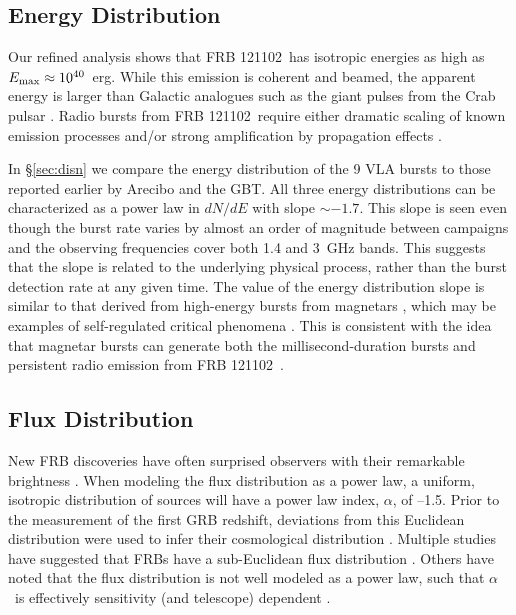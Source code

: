 \documentclass[twocolumn]{aastex61}
\newcommand{\frb}{FRB 121102}
\begin{document}
\subsection{Energy Distribution}

Our refined analysis shows that \frb\ has isotropic energies as high as $E_{\rm{max}}\approx10^{40}$\ erg. While this emission is coherent and beamed, the apparent energy is larger than Galactic analogues such as the giant pulses from the Crab pulsar \citep[$\sim10^{35}$~erg, $T_{b,\rm{Crab}}\sim10^{41}$~K;][]{2003Natur.422..141H,2014PhRvD..89j3009K}. Radio bursts from \frb\ require either dramatic scaling of known emission processes \citep{2016MNRAS.462..941L, 2016MNRAS.457..232C} and/or strong amplification by propagation effects \citep{2017arXiv170306580C}.

In \S \ref{sec:disn} we compare the energy distribution of the 9 VLA bursts to those reported earlier by Arecibo and the GBT. All three energy distributions can be characterized as a power law in $dN/dE$ with slope $\sim-1.7$. This slope is seen even though the burst rate varies by almost an order of magnitude between campaigns and the observing frequencies cover both 1.4 and 3~GHz bands. This suggests that the slope is related to the underlying physical process, rather than the burst detection rate at any given time. The value of the energy distribution slope is similar to that derived from high-energy bursts from magnetars \citep{2000ApJ...532L.121G, 2011ApJ...739...94S}, which may be examples of self-regulated critical phenomena \citep[slope$=-5/3$;][]{2011SoPh..274...99A}. This is consistent with the idea that magnetar bursts can generate both the millisecond-duration bursts and persistent radio emission from \frb\ \citep{2017arXiv170208644B}.

\subsection{Flux Distribution}

New FRB discoveries have often surprised observers with their remarkable brightness \citep{2007Sci...318..777L, 2016arXiv161105758R}. When modeling the flux distribution as a power law, a uniform, isotropic distribution of sources will have a power law index, $\alpha$, of --1.5. Prior to the measurement of the first GRB redshift, deviations from this Euclidean distribution were used to infer their cosmological distribution \citep[e.g., the $V/V_{\rm{max}}$\ test;][]{1992ApJ...388L..45M, 1995ApJ...453...25F}. Multiple studies have suggested that FRBs have a sub-Euclidean flux distribution \citep[$-0.5<\alpha<-0.9$;][]{2016ApJ...830...75V, 2016arXiv160206099L, 2016arXiv161100458L}. Others have noted that the flux distribution is not well modeled as a power law, such that $\alpha$\ is effectively sensitivity (and telescope) dependent \citep{2016MNRAS.461..984O, 2017arXiv170208040C}.
\end{document}
